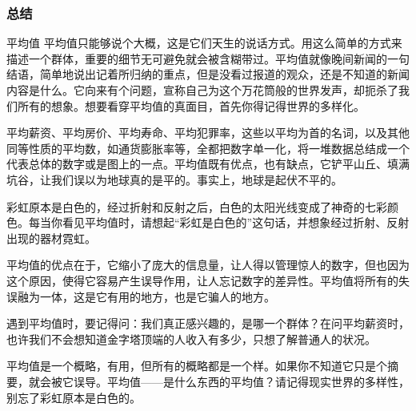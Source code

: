 \begin{frame}
  \frametitle{总结}
  \begin{block}{平均值}
    平均值只能够说个大概，这是它们天生的说话方式。用这么简单的方式来描述一个群体，重要的细节无可避免就会被含糊带过。平均值就像晚间新闻的一句结语，简单地说出记着所归纳的重点，但是没看过报道的观众，还是不知道的新闻内容是什么。它向来有个问题，宣称自己为这个万花筒般的世界发声，却扼杀了我们所有的想象。想要看穿平均值的真面目，首先你得记得世界的多样化。

    平均薪资、平均房价、平均寿命、平均犯罪率，这些以平均为首的名词，以及其他同等性质的平均数，如通货膨胀率等，全都把数字单一化，将一堆数据总结成一个代表总体的数字或是图上的一点。平均值既有优点，也有缺点，它铲平山丘、填满坑谷，让我们误以为地球真的是平的。事实上，地球是起伏不平的。

    彩虹原本是白色的，经过折射和反射之后，白色的太阳光线变成了神奇的七彩颜色。每当你看见平均值时，请想起“彩虹是白色的”这句话，并想象经过折射、反射出现的器材霓虹。

    平均值的优点在于，它缩小了庞大的信息量，让人得以管理惊人的数字，但也因为这个原因，使得它容易产生误导作用，让人忘记数字的差异性。平均值将所有的失误融为一体，这是它有用的地方，也是它骗人的地方。

    遇到平均值时，要记得问：我们真正感兴趣的，是哪一个群体？在问平均薪资时，也许我们不会想知道金字塔顶端的人收入有多少，只想了解普通人的状况。

    平均值是一个概略，有用，但所有的概略都是一个样。如果你不知道它只是个摘要，就会被它误导。平均值——是什么东西的平均值？请记得现实世界的多样性，别忘了彩虹原本是白色的。
  \end{block}
\end{frame}




